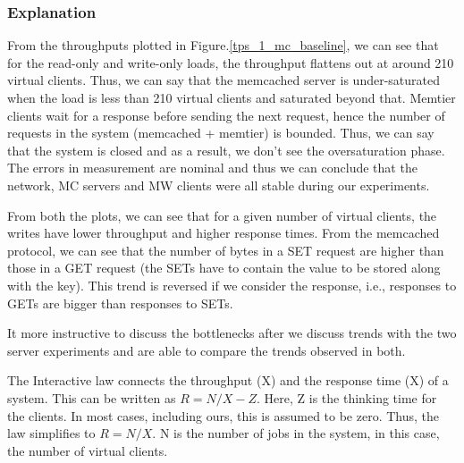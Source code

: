 \documentclass[11pt,a4paper]{article}
\newcommand\instructions[1]{\textcolor{blue}{Instructions: #1}}
\begin{document}
\subsubsection{Explanation}

From the throughputs plotted in Figure.\ref{tps_1_mc_baseline}, we can see that for the read-only and write-only loads, the throughput flattens out at around 210 virtual clients. Thus, we can say that the memcached server is under-saturated when the load is less than 210 virtual clients and saturated beyond that. Memtier clients wait for a response before sending the next request, hence the number of requests in the system (memcached + memtier) is bounded. Thus, we can say that the system is closed and as a result, we don't see the oversaturation phase. The errors in measurement are nominal and thus we can conclude that the network, MC servers and MW clients were all stable during our experiments.

From both the plots, we can see that for a given number of virtual clients, the writes have lower throughput and higher response times. From the memcached protocol, we can see that the number of bytes in a SET request are higher than those in a GET request (the SETs have to contain the value to be stored along with the key). This trend is reversed if we consider the response, i.e., responses to GETs are bigger than responses to SETs. 

It more instructive to discuss the bottlenecks after we discuss trends with the two server experiments and are able to compare the trends observed in both.

The Interactive law connects the throughput (X) and the response time (X) of a system. This can be written as 
$ R = N / X - Z$. Here, Z is the thinking time for the clients. In most cases, including ours, this is assumed to be zero. Thus, the law simplifies to $ R = N / X$. N is the number of jobs in the system, in this case, the number of virtual clients.
\end{document}
